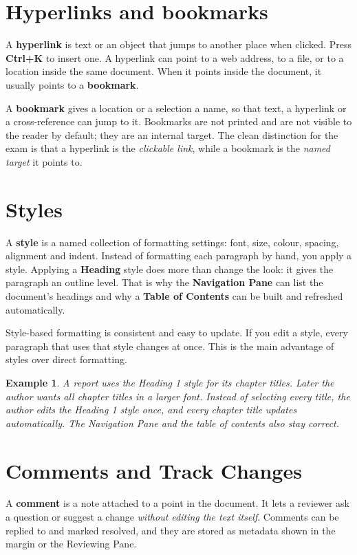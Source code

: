 \documentclass[11pt]{article}
\newtheorem{example}{Example}[section]
\begin{document}
\section{Hyperlinks and bookmarks}
A \textbf{hyperlink} is text or an object that jumps to another place when
clicked. Press \textbf{Ctrl+K} to insert one. A hyperlink can point to a web
address, to a file, or to a location inside the same document. When it points
inside the document, it usually points to a \textbf{bookmark}.

A \textbf{bookmark} gives a location or a selection a name, so that text,
a hyperlink or a cross-reference can jump to it. Bookmarks are not printed and
are not visible to the reader by default; they are an internal target. The
clean distinction for the exam is that a hyperlink is the \emph{clickable link},
while a bookmark is the \emph{named target} it points to.

\section{Styles}
A \textbf{style} is a named collection of formatting settings: font, size,
colour, spacing, alignment and indent. Instead of formatting each paragraph by
hand, you apply a style. Applying a \textbf{Heading} style does more than
change the look: it gives the paragraph an outline level. That is why the
\textbf{Navigation Pane} can list the document's headings and why a
\textbf{Table of Contents} can be built and refreshed automatically.

Style-based formatting is consistent and easy to update. If you edit a style,
every paragraph that uses that style changes at once. This is the main
advantage of styles over direct formatting.

\begin{example}
A report uses the Heading 1 style for its chapter titles. Later the author
wants all chapter titles in a larger font. Instead of selecting every title,
the author edits the Heading 1 style once, and every chapter title updates
automatically. The Navigation Pane and the table of contents also stay correct.
\end{example}

\section{Comments and Track Changes}
A \textbf{comment} is a note attached to a point in the document. It lets a
reviewer ask a question or suggest a change \emph{without editing the text
itself}. Comments can be replied to and marked resolved, and they are stored as
metadata shown in the margin or the Reviewing Pane.
\end{document}
